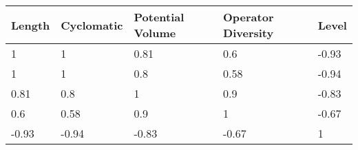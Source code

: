 \begin{tabular}{lllll}
Length & Cyclomatic & Potential Volume & Operator Diversity & Level \\ 
\hline 
1 & 1 & 0.81 & 0.6 & -0.93 \\ 
1 & 1 & 0.8 & 0.58 & -0.94 \\ 
0.81 & 0.8 & 1 & 0.9 & -0.83 \\ 
0.6 & 0.58 & 0.9 & 1 & -0.67 \\ 
-0.93 & -0.94 & -0.83 & -0.67 & 1 \\ 
\hline 
\end{tabular}